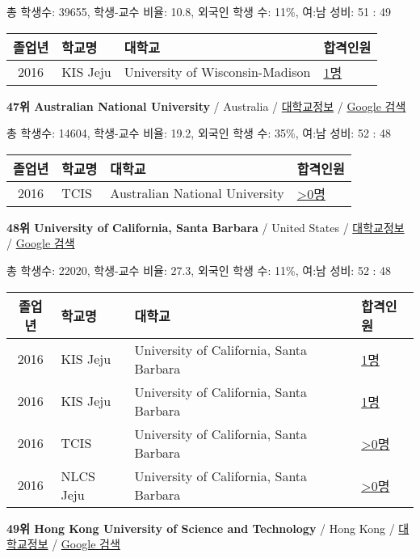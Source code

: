 \documentclass[13pt,]{article}
\begin{document}
총 학생수: 39655, 학생-교수 비율: 10.8, 외국인 학생 수: 11\%, 여:남
성비: 51 : 49

\begin{longtable}[]{@{}clll@{}}
\toprule
졸업년 & 학교명 & 대학교 & 합격인원\tabularnewline
\midrule
\endhead
2016 & KIS Jeju & University of Wisconsin-Madison &
\href{http://cafe.naver.com/assarabia/11596}{1명}\tabularnewline
\bottomrule
\end{longtable}

\textbf{47위 Australian National University} / Australia /
\href{https://www.timeshighereducation.com/world-university-rankings/australian-national-university?ranking-dataset=589595}{대학교정보}
/
\href{http://www.google.com/search?q=Australian+National+University}{Google
검색}

총 학생수: 14604, 학생-교수 비율: 19.2, 외국인 학생 수: 35\%, 여:남
성비: 52 : 48

\begin{longtable}[]{@{}clll@{}}
\toprule
졸업년 & 학교명 & 대학교 & 합격인원\tabularnewline
\midrule
\endhead
2016 & TCIS & Australian National University &
\href{http://cafe.naver.com/assarabia/11598}{\textgreater{}0명}\tabularnewline
\bottomrule
\end{longtable}

\textbf{48위 University of California, Santa Barbara} / United States /
\href{https://www.timeshighereducation.com/world-university-rankings/university-of-california-santa-barbara?ranking-dataset=589595}{대학교정보}
/
\href{http://www.google.com/search?q=University+of+California,+Santa+Barbara}{Google
검색}

총 학생수: 22020, 학생-교수 비율: 27.3, 외국인 학생 수: 11\%, 여:남
성비: 52 : 48

\begin{longtable}[]{@{}clll@{}}
\toprule
졸업년 & 학교명 & 대학교 & 합격인원\tabularnewline
\midrule
\endhead
2016 & KIS Jeju & University of California, Santa Barbara &
\href{http://cafe.naver.com/assarabia/11596}{1명}\tabularnewline
2016 & KIS Jeju & University of California, Santa Barbara &
\href{http://cafe.naver.com/assarabia/11596}{1명}\tabularnewline
2016 & TCIS & University of California, Santa Barbara &
\href{http://cafe.naver.com/assarabia/11598}{\textgreater{}0명}\tabularnewline
2016 & NLCS Jeju & University of California, Santa Barbara &
\href{http://cafe.naver.com/assarabia/11592}{\textgreater{}0명}\tabularnewline
\bottomrule
\end{longtable}

\textbf{49위 Hong Kong University of Science and Technology} / Hong Kong
/
\href{https://www.timeshighereducation.com/world-university-rankings/hong-kong-university-of-science-and-technology?ranking-dataset=589595}{대학교정보}
/
\href{http://www.google.com/search?q=Hong+Kong+University+of+Science+and+Technology}{Google
검색}
\end{document}
